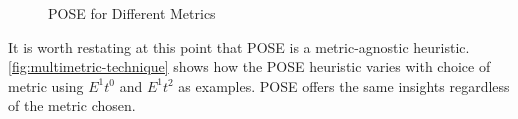 \begin{figure}
\centering

\caption{POSE for Different Metrics}
\label{fig:multimetric-technique}
\end{figure}

It is worth restating at this point that POSE is a metric-agnostic heuristic. \autoref{fig:multimetric-technique} shows how the POSE heuristic varies with choice of metric using $E^1t^0$ and $E^1t^2$ as examples. POSE offers the same insights regardless of the metric chosen.


